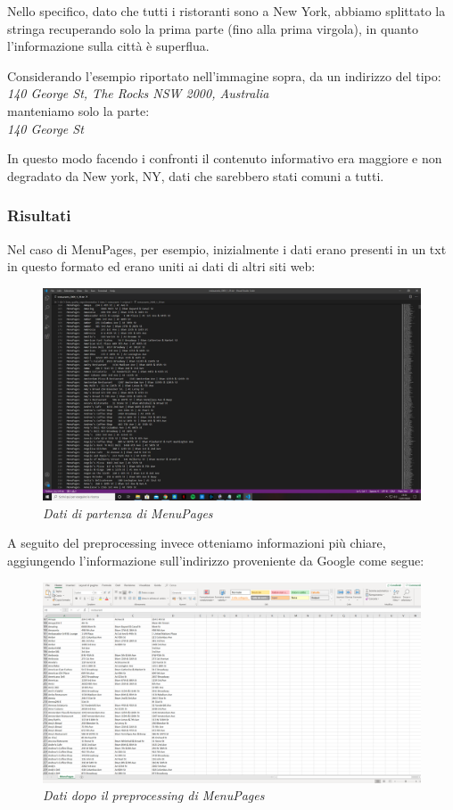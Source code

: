 \documentclass[a4paper,12pt]{article}
\begin{document}
\noindent Nello specifico,  dato che tutti i ristoranti sono a New York, abbiamo splittato la stringa recuperando solo la prima parte (fino alla prima virgola), in quanto l'informazione sulla città è superflua. 
 
\noindent Considerando l'esempio riportato nell'immagine sopra, da un indirizzo del tipo: \\
\textit{140 George St, The Rocks NSW 2000, Australia} \\
manteniamo solo la parte: \\
\textit{140 George St}

\noindent In questo modo facendo i confronti il contenuto informativo era maggiore e non degradato da New york, NY, dati che sarebbero stati comuni a tutti.

\subsubsection{Risultati}
Nel caso di MenuPages, per esempio, inizialmente i dati erano presenti in un txt in questo formato ed erano uniti ai dati di altri siti web:\\
\begin{figure}[H]
\centering
\includegraphics[width=0.9\linewidth]{img/original.png}
\caption{\textit{Dati di partenza di MenuPages}}
\end{figure}

\noindent A seguito del preprocessing invece otteniamo informazioni più chiare, aggiungendo l'informazione sull'indirizzo proveniente da Google come segue:\\

\begin{figure}[H]
\centering
\includegraphics[width=0.9\linewidth]{img/new.png}
\caption{\textit{Dati dopo il preprocessing di MenuPages}}
\end{figure}
\end{document}

